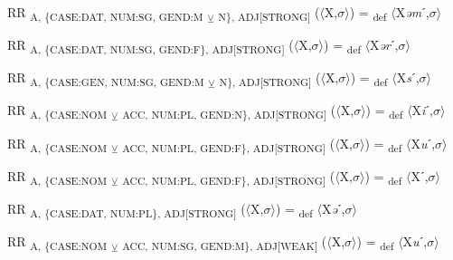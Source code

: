 {\begin{exe}
 RR \textsubscript{A, \{CASE:DAT, NUM:SG, GEND:M} \textsubscript{${\veebar}$}\textsubscript{ N\}, ADJ[STRONG]} ($\langle$X,$\sigma $$\rangle$) = \textsubscript{def} $\langle$X\textit{əm}ˊ,$\sigma $$\rangle$
\end{exe}

\begin{exe}
 RR \textsubscript{A, \{CASE:DAT, NUM:SG, GEND:F\}, ADJ[STRONG]} ($\langle$X,$\sigma $$\rangle$) = \textsubscript{def} $\langle$X\textit{ər}ˊ,$\sigma $$\rangle$
\end{exe}

\begin{exe}
 RR \textsubscript{A, \{CASE:GEN, NUM:SG, GEND:M} \textsubscript{${\veebar}$}\textsubscript{ N\}, ADJ[STRONG]} ($\langle$X,$\sigma $$\rangle$) = \textsubscript{def} $\langle$X\textit{s}ˊ,$\sigma $$\rangle$
\end{exe}

\begin{exe}
 RR \textsubscript{A, \{CASE:NOM} \textsubscript{${\veebar}$}\textsubscript{ ACC, NUM:PL, GEND:N\}, ADJ[STRONG]} ($\langle$X,$\sigma $$\rangle$) = \textsubscript{def} $\langle$X\textit{i}ˊ,$\sigma $$\rangle$
\end{exe}

\begin{exe}
 RR \textsubscript{A, \{CASE:NOM} \textsubscript{${\veebar}$}\textsubscript{ ACC, NUM:PL, GEND:F\}, ADJ[STRONG]} ($\langle$X,$\sigma $$\rangle$) = \textsubscript{def} $\langle$X\textit{u}ˊ,$\sigma $$\rangle$
\end{exe}

\begin{exe}
 RR \textsubscript{A, \{CASE:NOM} \textsubscript{${\veebar}$}\textsubscript{ ACC, NUM:PL, GEND:F\}, ADJ[STRONG]} ($\langle$X,$\sigma $$\rangle$) = \textsubscript{def} $\langle$Xˊ,$\sigma $$\rangle$
\end{exe}

\begin{exe}
 RR \textsubscript{A, \{CASE:DAT, NUM:PL\}, ADJ[STRONG]} ($\langle$X,$\sigma $$\rangle$) = \textsubscript{def} $\langle$X\textit{ə}ˊ,$\sigma $$\rangle$
\end{exe}

\begin{exe}
 RR \textsubscript{A, \{CASE:NOM} \textsubscript{${\veebar}$}\textsubscript{ ACC, NUM:SG, GEND:M\}, ADJ[WEAK]} ($\langle$X,$\sigma $$\rangle$) = \textsubscript{def} $\langle$X\textit{u}ˊ,$\sigma $$\rangle$
\end{exe}

}
